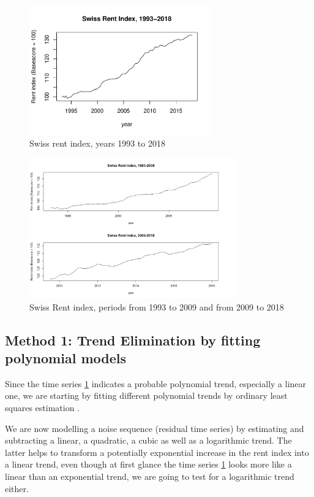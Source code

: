 \documentclass[11pt,a4paper]{article}
\begin{document}
\begin{figure}
    \centering
    \includegraphics[angle=0,width=0.7\textwidth]{indiceloyers_timeseries}
    \caption{Swiss rent index, years 1993 to 2018}
    \label{fig:indiceloyers_timeseries}
\end{figure}
 
\begin{figure}
    \centering
    \includegraphics[angle=0,width=0.8\textwidth]{indiceloyers_test_train}
    \caption{Swiss Rent index, periods from 1993 to 2009 and from 2009 to 2018}
    \label{fig:indiceloyers_test_train}
\end{figure}


\subsection{Method 1: Trend Elimination by fitting polynomial models}

Since the time series \ref{fig:indiceloyers_timeseries} indicates a probable polynomial trend, especially a linear one, we are starting by fitting different polynomial trends by ordinary least squares estimation \cite[p.~11]{htf09}.

We are now modelling a noise sequence (residual time series) by estimating and subtracting a linear, a quadratic, a cubic as well as a logarithmic trend.
The latter  helps to transform a potentially exponential increase in the rent index into a linear trend, even though at first glance the time series \cref{fig:indiceloyers_timeseries} looks more like a linear than an exponential trend, we are going to test for a logarithmic trend either.
\end{document}
